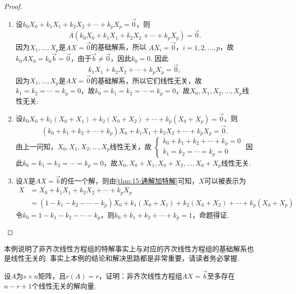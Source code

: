 \begin{proof}
    \begin{enumerate}
        \item 设$k_0X_0+k_1X_1+k_2X_2+\cdots+k_pX_p=\vec{0}$，则
        \[A(k_0X_0+k_1X_1+k_2X_2+\cdots+k_pX_p)=\vec{0}.\]
        因为$X_1,\ldots,X_p$是$AX=\vec{0}$的基础解系，所以
        $AX_i=\vec{0}$，$i=1,2,\ldots,p$，故$k_0AX_0=k_0\vec{b}=\vec{0}$，由于$\vec{b}\neq \vec{0}$，因此$k_0=0$. 因此
        \[k_1X_1+k_2X_2+\cdots+k_pX_p=\vec{0},\]
        因为$X_1,\ldots,X_p$是$AX=\vec{0}$的基础解系，所以它们线性无关，故$k_1=k_2=\cdots=k_p=0$，故$k_0=k_1=k_2=\cdots=k_p=0$，故$X_0,X_1,X_2,\ldots,X_p$线性无关.

        \item 设$k_0X_0+k_1(X_0+X_1)+k_2(X_0+X_2)+\cdots+k_p(X_0+X_p)=\vec{0}$，则
        \[(k_0+k_1+k_2+\cdots+k_p)X_0+k_1X_1+k_2X_2+\cdots+k_pX_p=\vec{0}.\]
        由上一问知，$X_0,X_1,X_2,\ldots,X_p$线性无关，故
        $\begin{cases}
            k_0+k_1+k_2+\cdots+k_p=0 \\
            k_1=k_2=\cdots=k_p=0
        \end{cases}$
        因此$k_0=k_1=k_2=\cdots=k_p=0$，故$X_0,X_0+X_1,X_0+X_2,\ldots,X_0+X_p$线性无关.

        \item 设$X$是$AX=\vec{b}$的任一个解，则由\autoref{thm:15:通解加特解}可知，$X$可以被表示为
        \begin{align*}
            X   &=X_0+k_1X_1+k_2X_2+\cdots+k_pX_p \\
                &=(1-k_1-k_2-\cdots-k_p)X_0+k_1(X_0+X_1)+k_2(X_0+X_2)+\cdots+k_p(X_0+X_p)
        \end{align*}
        令$k_0=1-k_1-k_2-\cdots-k_p$，则$k_0+k_1+k_2+\cdots+k_p=1$，命题得证.
    \end{enumerate}
\end{proof}

本例说明了非齐次线性方程组的特解事实上与对应的齐次线性方程组的基础解系也是线性无关的. 事实上本例的结论和解决思路都是非常重要，请读者务必掌握.

\begin{example}\label{ex:15:非齐次线性无关解}
    设$A$为$s \times n$矩阵，且$r(A)=r$，证明：非齐次线性方程组$AX=\vec{b}$至多存在$n-r+1$个线性无关的解向量.
\end{example}

